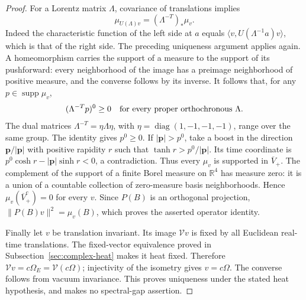 \begin{proof}
For a Lorentz matrix $\Lambda$, covariance of translations implies
\[
 \mu_{U(\Lambda)v}=(\Lambda^{-T})_*\mu_v.
\]
Indeed the characteristic function of the left side at $a$ equals
$\langle v,U(\Lambda^{-1}a)v\rangle$, which is that of the right side.
The preceding uniqueness argument applies again. A homeomorphism carries
the support of a measure to the support of its pushforward: every
neighborhood of the image has a preimage neighborhood of positive measure,
and the converse follows by its inverse. It follows that, for any
$p\in\operatorname{supp}\mu_v$,
\[
 (\Lambda^{-T}p)^0\geq0\quad\hbox{for every proper orthochronous }\Lambda.
\]
The dual matrices $\Lambda^{-T}=\eta\Lambda\eta$, with
$\eta=\operatorname{diag}(1,-1,-1,-1)$, range over the same group.
The identity gives $p^0\geq0$. If $|\mathbf p|>p^0$, take a boost in the
direction $\mathbf p/|\mathbf p|$ with positive rapidity $r$ such that
$\tanh r>p^0/|\mathbf p|$. Its time coordinate is
$p^0\cosh r-|\mathbf p|\sinh r<0$, a contradiction. Thus every
$\mu_v$ is supported in $\overline V_+$.
The complement of the support of a finite Borel measure on $\mathbb R^4$
has measure zero: it is a union of a countable collection of zero-measure
basis neighborhoods. Hence $\mu_v(\overline V_+^c)=0$ for every $v$.
Since $P(B)$ is an orthogonal projection,
$\|P(B)v\|^2=\mu_v(B)$, which proves the asserted operator identity.

Finally let $v$ be translation invariant. Its image $\mathcal Vv$ is fixed by all
Euclidean real-time translations. The fixed-vector equivalence proved in
Subsection~\ref{sec:complex-heat} makes it heat fixed. Therefore
$\mathcal Vv=c\Omega_E=\mathcal V(c\Omega)$; injectivity of the isometry gives
$v=c\Omega$. The converse follows from vacuum invariance. This proves
uniqueness under the stated heat hypothesis, and makes no spectral-gap
assertion.
\end{proof}

